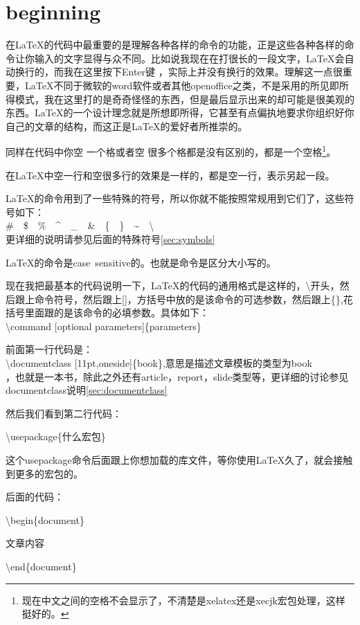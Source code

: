\documentclass[11pt,oneside]{book}
\begin{document}
\chapter{beginning}
在\LaTeX 的代码中最重要的是理解各种各样的命令的功能，正是这些各种各样的命令让你输入的文字显得与众不同。比如说我现在在打很长的一段文字，\LaTeX 会自动换行的，而我在这里按下Enter键
，实际上并没有换行的效果。理解这一点很重要，\LaTeX 不同于微软的word软件或者其他openoffice之类，不是采用的所见即所得模式，我在这里打的是奇奇怪怪的东西，但是最后显示出来的却可能是很美观的东西。\LaTeX 的一个设计理念就是所想即所得，它甚至有点偏执地要求你组织好你自己的文章的结构，而这正是\LaTeX 的爱好者所推崇的。

同样在代码中你空 一个格或者空      很多个格都是没有区别的，都是一个空格\footnote{现在中文之间的空格不会显示了，不清楚是xelatex还是xecjk宏包处理，这样挺好的。}。

在\LaTeX 中空一行和空很多行的效果是一样的，都是空一行，表示另起一段。

\LaTeX 的命令用到了一些特殊的符号，所以你就不能按照常规用到它们了，这些符号如下：\\
\#~~\$~~\%~~\^~~\_~~\&~~\{~~\}~~\~~~\textbackslash \\
更详细的说明请参见后面的特殊符号\ref{sec:symbols}

\LaTeX 的命令是case~sensitive的。也就是命令是区分大小写的。

现在我把最基本的代码说明一下，\LaTeX 的代码的通用格式是这样的，\textbackslash{}开头，然后跟上命令符号，然后跟上[]，方括号中放的是该命令的可选参数，然后跟上\{\},花括号里面跟的是该命令的必填参数。具体如下：\\
\textbackslash command [optional parameters]\{parameters\}

前面第一行代码是：\\
\textbackslash documentclass [11pt,oneside]\{book\},意思是描述文章模板的类型为book\\，也就是一本书，除此之外还有article，report，slide类型等，更详细的讨论参见documentclass说明\ref{sec:documentclass}

然后我们看到第二行代码：

\textbackslash usepackage\{什么宏包\}

这个usepackage命令后面跟上你想加载的库文件，等你使用\LaTeX 久了，就会接触到更多的宏包的。

后面的代码：

\textbackslash begin\{document\}

文章内容

\textbackslash end\{document\}
\end{document}
